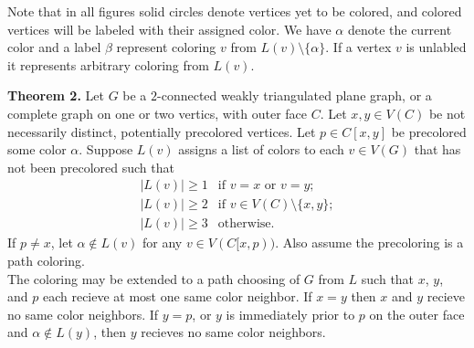 \documentclass[11pt,letter]{article}
\begin{document}
\noindent Note that in all figures solid circles denote vertices yet to be colored, and colored vertices will
be labeled with their assigned color. We have $\alpha$ denote the current color and a label $\beta$ represent
coloring $v$ from $L(v)\setminus\{\alpha\}$. If a vertex $v$ is unlabled it represents arbitrary coloring from
$L(v)$.\\

\begin{adjustwidth}{1.5em}{1.5em}
\noindent\textbf{Theorem 2.} Let $G$ be a $2$-connected weakly triangulated plane graph, or a complete graph
on one or two vertics, with outer face $C$. 
Let $x,y\in V(C)$ be not necessarily distinct, potentially precolored vertices. Let $p\in C[x,y]$ be precolored some
color $\alpha$. Suppose $L(v)$ assigns a list of colors to each $v\in V(G)$ that has not been precolored such that
\[
    \begin{array}{ll}
	    |L(v)|\ge 1 & \text{if } v=x \text{ or } v=y;\\
	    |L(v)|\ge 2 & \text{if } v\in V(C)\setminus\{x,y\};\\
	    |L(v)|\ge 3 & \text{otherwise.}
    \end{array}
\]
If $p\ne x$, let $\alpha\not\in L(v)$ for
any $v\in V(C[x,p))$. Also assume the precoloring is a path coloring.\\

\noindent The coloring may be extended to
a path choosing of $G$ from $L$ such that $x$, $y$, and $p$ each recieve at most one same color neighbor. If
$x=y$ then $x$ and $y$ recieve no same color neighbors. If $y=p$, or $y$ is immediately prior to
$p$ on the outer face and $\alpha\not\in L(y)$, then $y$ recieves no same color neighbors.\\
\end{adjustwidth}
\end{document}
